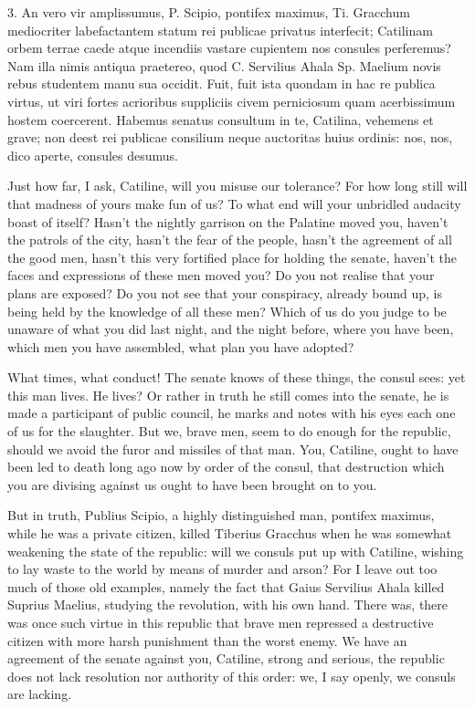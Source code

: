 {  3. An vero vir amplissumus, P. Scipio, pontifex maximus, Ti. Gracchum mediocriter labefactantem statum rei publicae privatus interfecit; Catilinam orbem terrae caede atque incendiis vastare cupientem nos consules perferemus? Nam illa nimis antiqua praetereo, quod C. Servilius Ahala Sp. Maelium novis rebus studentem manu sua occidit. Fuit, fuit ista quondam in hac re publica virtus, ut viri fortes acrioribus suppliciis civem perniciosum quam acerbissimum hostem coercerent. Habemus senatus consultum in te, Catilina, vehemens et grave; non deest rei publicae consilium neque auctoritas huius ordinis: nos, nos, dico aperte, consules desumus.
}{
  Just how far, I ask, Catiline, will you misuse our tolerance? For how long still will that madness of yours make fun of us? To what end will your unbridled audacity boast of itself? Hasn’t the nightly garrison on the Palatine moved you, haven’t the patrols of the city, hasn’t the fear of the people, hasn’t the agreement of all the good men, hasn’t this very fortified place for holding the senate, haven’t the faces and expressions of these men moved you? Do you not realise that your plans are exposed? Do you not see that your conspiracy, already bound up, is being held by the knowledge of all these men? Which of us do you judge to be unaware of what you did last night, and the night before, where you have been, which men you have assembled, what plan you have adopted?

  What times, what conduct! The senate knows of these things, the consul sees: yet this man lives. He lives? Or rather in truth he still comes into the senate, he is made a participant of public council, he marks and notes with his eyes each one of us for the slaughter. But we, brave men, seem to do enough for the republic, should we avoid the furor and missiles of that man. You, Catiline, ought to have been led to death long ago now by order of the consul, that destruction which you are divising against us ought to have been brought on to you.

  But in truth, Publius Scipio, a highly distinguished man, pontifex maximus, while he was a private citizen, killed Tiberius Gracchus when he was somewhat weakening the state of the republic: will we consuls put up with Catiline, wishing to lay waste to the world by means of murder and arson? For I leave out too much of those old examples, namely the fact that Gaius Servilius Ahala killed Suprius Maelius, studying the revolution, with his own hand. There was, there was once such virtue in this republic that brave men repressed a destructive citizen with more harsh punishment than the worst enemy. We have an agreement of the senate against you, Catiline, strong and serious, the republic does not lack resolution nor authority of this order: we, I say openly, we consuls are lacking.
}
